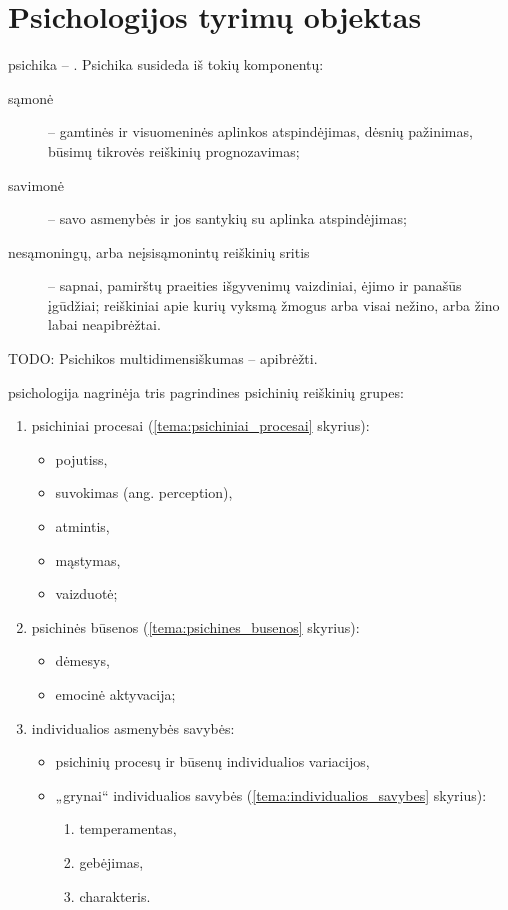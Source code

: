 \section{Psichologijos tyrimų objektas}

\label{tema:psichikos_samprata}

\Gls{psichika} – . Psichika susideda iš tokių 
komponentų:
\begin{description}
  \item[sąmonė] – gamtinės ir visuomeninės aplinkos atspindėjimas, dėsnių
    pažinimas, būsimų tikrovės reiškinių prognozavimas;
  \item[savimonė] – savo asmenybės ir jos santykių su aplinka atspindėjimas;
  \item[nesąmoningų, arba neįsisąmonintų reiškinių sritis] – sapnai, 
    pamirštų praeities išgyvenimų vaizdiniai, ėjimo ir panašūs įgūdžiai;
    reiškiniai apie kurių vyksmą žmogus arba visai nežino, arba žino
    labai neapibrėžtai.
\end{description}

TODO: Psichikos multidimensiškumas – apibrėžti.

\Gls{psichologija} nagrinėja tris pagrindines psichinių reiškinių grupes:
\begin{enumerate}
  \item psichiniai procesai (\ref{tema:psichiniai_procesai} skyrius):
    \begin{itemize}
      \item \glspl{pojutis},
      \item suvokimas (ang. perception),
      \item atmintis,
      \item mąstymas,
      \item vaizduotė;
    \end{itemize}
  \item psichinės būsenos (\ref{tema:psichines_busenos} skyrius):
    \begin{itemize}
      \item dėmesys,
      \item emocinė aktyvacija;
    \end{itemize}
  \item individualios asmenybės savybės:
    \begin{itemize}
      \item psichinių procesų ir būsenų individualios variacijos,
      \item „grynai“ individualios savybės
        (\ref{tema:individualios_savybes} skyrius):
        \begin{enumerate}
          \item temperamentas,
          \item gebėjimas,
          \item charakteris.
        \end{enumerate}
    \end{itemize}
\end{enumerate}


